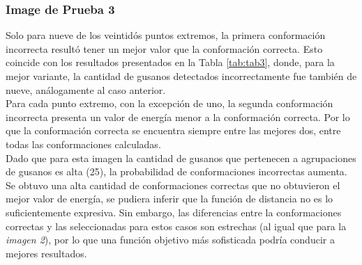 \subsubsection*{Image de Prueba 3}

Solo para nueve de los veintid\'os puntos extremos, la primera conformaci\'on
incorrecta result\'o tener un mejor valor que la conformaci\'on correcta.
Esto coincide con los resultados presentados en la Tabla \ref{tab:tab3},
donde, para la mejor variante, la cantidad de gusanos detectados incorrectamente
fue tambi\'en de nueve, an\'alogamente al caso anterior.\\
Para cada punto extremo, con la excepci\'on de uno, la segunda conformaci\'on
incorrecta presenta un valor de energ\'ia menor a la conformaci\'on correcta.
Por lo que la conformaci\'on correcta se encuentra siempre
entre las mejores dos, entre todas las conformaciones calculadas.\\

Dado que para esta imagen la cantidad de gusanos que pertenecen a agrupaciones
de gusanos es alta (25), la probabilidad de conformaciones
incorrectas aumenta. Se obtuvo una alta cantidad de conformaciones correctas 
que no obtuvieron el mejor valor de energ\'ia, se pudiera inferir que la funci\'on de distancia
no es lo suficientemente expresiva. Sin embargo, las diferencias entre la
conformaciones correctas y las seleccionadas para estos casos son estrechas
(al igual que para la \emph{imagen 2}), por lo que una funci\'on objetivo
m\'as sofisticada podr\'ia conducir a mejores resultados.
